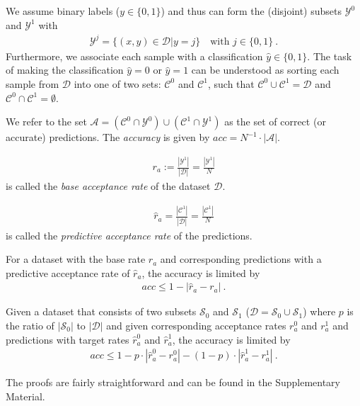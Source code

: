 We assume binary labels ($y\in \{0, 1\}$) and thus can form the (disjoint) subsets $\mathcal{\mathcal{Y}}^0$ and $\mathcal{Y}^1$ with
\begin{align}
  \mathcal{Y}^j = \{(x, y)\in \mathcal{D}|y = j\}\quad\text{with } j\in\{0, 1\}~.
\end{align}
Furthermore, we associate each sample with a classification $\hat{y}\in \{0, 1\}$.
The task of making the classification $\hat{y}=0$ or $\hat{y}=1$ can be understood as sorting each sample from $\mathcal{D}$
into one of two sets: $\mathcal{C}^0$ and $\mathcal{C}^1$,
such that $\mathcal{C}^0\cup\mathcal{C}^1 = \mathcal{D}$ and $\mathcal{C}^0\cap\mathcal{C}^1 = \emptyset$.

We refer to the set $\mathcal{A} = (\mathcal{C}^0\cap\mathcal{Y}^0) \cup (\mathcal{C}^1\cap\mathcal{Y}^1)$
as the set of correct (or accurate) predictions.
The \emph{accuracy} is given by $\mathit{acc} = N^{-1}\cdot\left|\mathcal{A}\right|$.
\begin{definition}
  \begin{align}
    r_a := \frac{\left|\mathcal{Y}^1\right|}{|\mathcal{D}|} = \frac{\left|\mathcal{Y}^1\right|}{N}
  \end{align}
  is called the \emph{base acceptance rate} of the dataset $\mathcal{D}$.
\end{definition}

\begin{definition}
  \begin{align}
    \hat{r}_a = \frac{\left|\mathcal{C}^1\right|}{|\mathcal{D}|} = \frac{\left|\mathcal{C}^1\right|}{N}
  \end{align}
  is called the \emph{predictive acceptance rate} of the predictions.
\end{definition}

\begin{theorem}\label{th:fairacc}
  For a dataset with the base rate $r_a$ and corresponding predictions with a predictive acceptance rate of $\hat{r}_a$,
  the accuracy is limited by
  \begin{align}
    \mathit{acc} \leq 1 - \left| \hat{r}_a -r_a \right|~.
  \end{align}
\end{theorem}
\begin{corollary}\label{col:fairacc}
  Given a dataset that consists of two subsets $\mathcal{S}_0$
  and $\mathcal{S}_1$ ($\mathcal{D} = \mathcal{S}_0 \cup \mathcal{S}_1$)
  where $p$ is the ratio of $|\mathcal{S}_0|$ to $|\mathcal{D}|$
  and given corresponding acceptance rates $r^0_a$ and $r^1_a$
  and predictions with target rates $\hat{r}^0_a$ and $\hat{r}^1_a$,
  the accuracy is limited by
  \begin{align}
    \mathit{acc} \leq 1 - p\cdot\left| \hat{r}^0_a -r^0_a \right| - (1-p)\cdot\left| \hat{r}^1_a -r^1_a \right|~.
  \end{align}
\end{corollary}
The proofs are fairly straightforward and can be found in the Supplementary Material.

